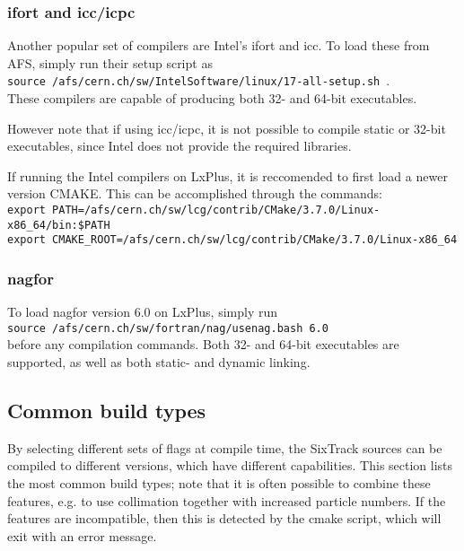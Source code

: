 \documentclass[english]{article}
\begin{document}

\subsubsection{ifort and icc/icpc}
Another popular set of compilers are Intel's ifort and icc.
To load these from AFS, simply run their setup script as\\
{\small
  \texttt{source /afs/cern.ch/sw/IntelSoftware/linux/17-all-setup.sh}~.\\
}
These compilers are capable of producing both 32- and 64-bit executables.

However note that if using icc/icpc, it is not possible to compile static or 32-bit executables, since Intel does not provide the required libraries.

If running the Intel compilers on LxPlus, it is reccomended to first load a newer version CMAKE.
This can be accomplished through the commands:\\
{\scriptsize
  \texttt{export PATH=/afs/cern.ch/sw/lcg/contrib/CMake/3.7.0/Linux-x86\_64/bin:\$PATH}\\
  \texttt{export CMAKE\_ROOT=/afs/cern.ch/sw/lcg/contrib/CMake/3.7.0/Linux-x86\_64}
}

\subsubsection{nagfor}

To load nagfor version 6.0 on LxPlus, simply run\\
\texttt{source /afs/cern.ch/sw/fortran/nag/usenag.bash 6.0}\\
before any compilation commands.
Both 32- and 64-bit executables are supported, as well as both static- and dynamic linking.


\subsection{Common build types}
\label{sec:building:options}
By selecting different sets of flags at compile time, the SixTrack sources can be compiled to different versions, which have different capabilities.
This section lists the most common build types; note that it is often possible to combine these features, e.g. to use collimation together with increased particle numbers.
If the features are incompatible, then this is detected by the cmake script, which will exit with an error message.
\end{document}
